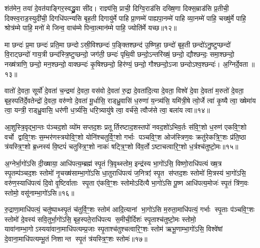 शंत॑मेन॒ तया॑ दे॒वत॑याङ्गिर॒स्वद्ध्रु॒वा सी॑द। राज्ञ्य॑सि॒ प्राची॒ दिग्वि॒राड॑सि दख्षि॒णा दिक्स॒म्राड॑सि प्र॒तीची॒ दिक्स्व॒राड॒स्युदी॑ची॒ दिगधि॑पत्न्यसि बृह॒ती दिगायु॑र्मे पाहि प्रा॒णम्मे॑ पाह्यपा॒नम्मे॑ पाहि व्या॒नम्मे॑ पाहि॒ चख्षु॑र्मे पाहि॒ श्रोत्र॑म्मे पाहि॒ मनो॑ मे जिन्व॒ वाच॑म्मे पिन्वा॒त्मान॑म्मे पाहि॒ ज्योति॑र्मे यच्छ॥१२॥

{\anuvakamend[{छ॒र्दिषा॑ पिन्व॒ षट्च॑॥६॥}]}

मा छन्दः॑ प्र॒मा छन्दः॑ प्रति॒मा छन्दोऽस्री॒विश्छन्दः॑ प॒ङ्क्तिश्छन्द॑ उ॒ष्णिहा॒ छन्दो॑ बृह॒ती छन्दो॑ऽनु॒ष्टुप्छन्दो॑ वि॒राट्छन्दो॑ गाय॒त्री छन्द॑स्त्रि॒ष्टुप्छन्दो॒ जग॑ती॒ छन्दः॑ पृथि॒वी छन्दो॒ऽन्तरि॑ख्षं॒ छन्दो॒ द्यौश्छन्दः॒ समा॒श्छन्दो॒ नख्ष॑त्राणि॒ छन्दो॒ मन॒श्छन्दो॒ वाक्छन्दः॑ कृ॒षिश्छन्दो॒ हिर॑ण्यं॒ छन्दो॒ गौश्छन्दो॒ऽजा छन्दोऽश्व॒श्छन्दः॑। अ॒ग्निर्दे॒वता॥१३॥

वातो॑ दे॒वता॒ सूर्यो॑ दे॒वता॑ च॒न्द्रमा॑ दे॒वता॒ वस॑वो दे॒वता॑ रु॒द्रा दे॒वता॑दि॒त्या दे॒वता॒ विश्वे॑ दे॒वा दे॒वता॑ म॒रुतो॑ दे॒वता॒ बृह॒स्पति॑र्दे॒वतेन्द्रो॑ दे॒वता॒ वरु॑णो दे॒वता॑ मू॒र्धासि॒ राड्ध्रु॒वासि॑ ध॒रुणा॑ य॒न्त्र्य॑सि॒ यमि॑त्री॒षे त्वो॒र्जे त्वा॑ कृ॒ष्यै त्वा॒ ख्षेमा॑य त्वा॒ यन्त्री॒ राड्ध्रु॒वासि॒ धर॑णी ध॒र्त्र्य॑सि॒ धरि॒त्र्यायु॑षे त्वा॒ वर्च॑से॒ त्वौज॑से त्वा॒ बला॑य त्वा॥१४॥

{\anuvakamend[{दे॒वताऽऽयु॑षे त्वा॒ षट्च॑॥७॥}]}

आ॒शुस्त्रि॒वृद्भा॒न्तः प॑ञ्चद॒शो व्यो॑म सप्तद॒शः प्रतूर्तिरष्टाद॒शस्तपो॑ नवद॒शो॑ऽभिव॒र्तः स॑वि॒ꣳ॒शो ध॒रुण॑ एकवि॒ꣳ॒शो वर्चो द्वावि॒ꣳ॒शः स॒म्भर॑णस्त्रयोवि॒ꣳ॒शो योनि॑श्चतुर्वि॒ꣳ॒शो गर्भाः पञ्चवि॒ꣳ॒श ओज॑स्त्रिण॒वः क्रतु॑रेकत्रि॒ꣳ॒शः प्र॑ति॒ष्ठा त्र॑यस्त्रि॒ꣳ॒शो ब्र॒ध्नस्य॑ वि॒ष्टपं॑ चतुस्त्रि॒ꣳ॒शो नाकः॑ षट्त्रि॒ꣳ॒शो वि॑व॒र्तोऽष्टाचत्वारि॒ꣳ॒शो ध॒र्त्रश्च॑तुष्टो॒मः॥१५॥

{\anuvakamend[{आ॒शुस्स॒प्तत्रिꣳ॑शत्॥८॥}]}

अ॒ग्नेर्भा॒गो॑ऽसि दी॒ख्षाया॒ आधि॑पत्य॒म्ब्रह्म॑ स्पृ॒तं त्रि॒वृथ्स्तोम॒ इन्द्र॑स्य भा॒गो॑ऽसि॒ विष्णो॒राधि॑पत्यं ख्ष॒त्र स्पृ॒तम्प॑ञ्चद॒शः स्तोमो॑ नृ॒चख्ष॑साम्भा॒गो॑ऽसि धा॒तुराधि॑पत्यं ज॒नित्रꣵ॑ स्पृ॒त स॑प्तद॒शः स्तोमो॑ मि॒त्रस्य॑ भा॒गो॑ऽसि॒ वरु॑ण॒स्याधि॑पत्यं दि॒वो वृ॒ष्टिर्वाताः स्पृ॒ता ए॑कवि॒ꣳ॒शः स्तोमोऽदि॑त्यै भा॒गो॑ऽसि पू॒ष्ण आधि॑पत्य॒मोजः॑ स्पृ॒तं त्रि॑ण॒वः स्तोमो॒ वसू॑नाम्भा॒गो॑ऽसि॥१६॥

रु॒द्राणा॒माधि॑पत्यं॒ चतु॑ष्पाथ्स्पृ॒तं च॑तुर्वि॒ꣳ॒शः स्तोम॑ आदि॒त्यानां भा॒गो॑ऽसि म॒रुता॒माधि॑पत्यं॒ गर्भाः स्पृ॒ताः प॑ञ्चवि॒ꣳ॒शः स्तोमो॑ दे॒वस्य॑ सवि॒तुर्भा॒गो॑ऽसि॒ बृह॒स्पते॒राधि॑पत्य स॒मीची॒र्दिशः॑ स्पृ॒ताश्च॑तुष्टो॒मः स्तोमो॒ यावा॑नाम्भा॒गोऽस्यया॑वाना॒माधि॑पत्यम्प्र॒जाः स्पृ॒ताश्च॑तुश्चत्वारि॒ꣳ॒शः स्तोम॑ ऋभू॒णाम्भा॒गो॑ऽसि॒ विश्वे॑षां दे॒वाना॒माधि॑पत्यम्भू॒तं निशान्त स्पृ॒तं त्र॑यस्त्रि॒ꣳ॒शः स्तोमः॑॥१७॥

